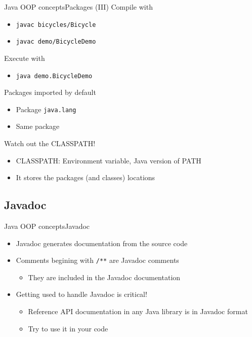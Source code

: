 \documentclass[10pt,compress]{beamer} %
\begin{document}
\begin{frame}{Java OOP concepts}{Packages (III)}
	Compile with\\ 
	\begin{itemize}
	\item \texttt{javac bicycles/Bicycle}\\
	\item \texttt{javac demo/BicycleDemo}\\
	\end{itemize}
	Execute with\\
	\begin{itemize}
	\item \texttt{java demo.BicycleDemo}
	\end{itemize}
	Packages imported by default
		\begin{itemize}
		\item Package \texttt{java.lang}
		\item Same package
		\end{itemize}
		\alert{Watch out the CLASSPATH!}
		\begin{itemize}
		\item CLASSPATH: Environment variable, Java version of PATH
		\item It stores the packages (and classes) locations
		\end{itemize}
\end{frame}

\subsection{Javadoc}
\begin{frame}{Java OOP concepts}{Javadoc}
	\begin{itemize}
	\item Javadoc generates documentation from the source code
	\item Comments begining with \texttt{/**} are Javadoc comments
		\begin{itemize}
		\item They are included in the Javadoc documentation
		\end{itemize}
	\item Getting used to handle Javadoc is critical!
		\begin{itemize}
		\item Reference API documentation in any Java library is in Javadoc format
		\item Try to use it in your code
		\end{itemize}
	\end{itemize}
\end{frame}
\end{document}
